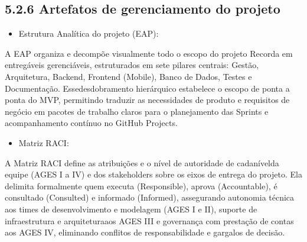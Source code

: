 \hypertarget{__RefHeading___Toc4837_3118176633 Copy 1}{}
\subsection*{5.2.6 Artefatos de gerenciamento do projeto}
\label{ages-iv:text-h-0114}

\begin{itemize}
\item Estrutura Analítica do projeto (EAP):
\end{itemize}

\indent A EAP organiza e decompõe visualmente todo o escopo do projeto Recorda em entregáveis gerenciáveis, estruturados em sete pilares centrais: Gestão, Arquitetura, Backend, Frontend (Mobile), Banco de Dados, Testes e Documentação. Esse\originalspace{}desdobramento hierárquico estabelece o escopo de ponta a ponta do MVP, permitindo traduzir as necessidades de produto e requisitos de negócio em pacotes de trabalho claros para o planejamento das Sprints e acompanhamento contínuo no GitHub Projects.\par


\begin{itemize}
\item Matriz RACI:
\end{itemize}

\indent A Matriz RACI define as atribuições e o nível de autoridade de cada\originalspace{}nível\originalspace{}da equipe (AGES I a IV) e dos stakeholders sobre os eixos de entrega do projeto. Ela delimita formalmente quem executa (Responsible), aprova (Accountable), é consultado (Consulted) e informado (Informed), assegurando autonomia técnica aos times de desenvolvimento e modelagem (AGES I e II), suporte de infraestrutura e arquitetura\originalspace{}aos AGES III e governança com prestação de contas aos AGES IV, eliminando conflitos de responsabilidade e gargalos de decisão.\par


